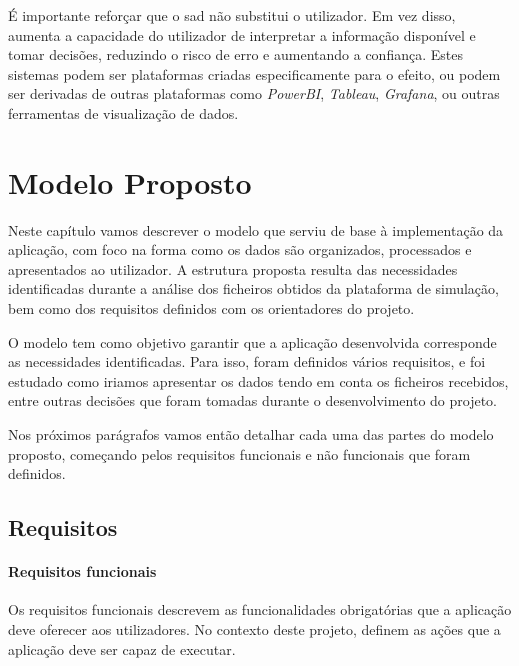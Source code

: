 É importante reforçar que o \gls{sad} não substitui o utilizador. Em vez disso, aumenta a capacidade do utilizador de interpretar a informação disponível e tomar decisões, reduzindo o risco de erro e aumentando a confiança. Estes sistemas podem ser plataformas criadas especificamente para o efeito, ou podem ser derivadas de outras plataformas como \textit{PowerBI}\cite{powerbi}, \textit{Tableau}\cite{tableau}, \textit{Grafana}\cite{grafana}, ou outras ferramentas de visualização de dados.

\chapter{Modelo Proposto}
\label{ch:modeloProposto}

Neste capítulo vamos descrever o modelo que serviu de base à implementação da aplicação, com foco na forma como os dados são organizados, processados e apresentados ao utilizador. A estrutura proposta resulta das necessidades identificadas durante a análise dos ficheiros obtidos da plataforma de simulação, bem como dos requisitos definidos com os orientadores do projeto.

O modelo tem como objetivo garantir que a aplicação desenvolvida corresponde as necessidades identificadas. Para isso, foram definidos vários requisitos, e foi estudado como iriamos apresentar os dados tendo em conta os ficheiros recebidos, entre outras decisões que foram tomadas durante o desenvolvimento do projeto.

Nos próximos parágrafos vamos então detalhar cada uma das partes do modelo proposto, começando pelos requisitos funcionais e não funcionais que foram definidos.

\section{Requisitos}
\label{sec:requisitos}

\subsubsection{Requisitos funcionais}

Os requisitos funcionais descrevem as funcionalidades obrigatórias que a aplicação deve oferecer aos utilizadores. No contexto deste projeto, definem as ações que a aplicação deve ser capaz de executar.

